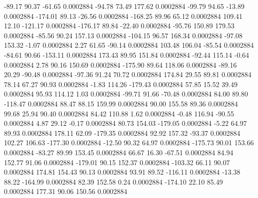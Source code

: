       -89.17       90.37      -61.65     0.0002884
      -94.78       73.49      177.62     0.0002884
      -99.79       94.65      -13.89     0.0002884
     -174.01       89.13      -26.56     0.0002884
     -168.25       89.96       65.12     0.0002884
      109.41       12.10     -121.17     0.0002884
     -176.17       89.84      -22.40     0.0002884
      -95.76      150.89      179.53     0.0002884
      -85.56       90.24      157.13     0.0002884
     -104.15       96.57      168.34     0.0002884
      -97.08      153.32       -1.07     0.0002884
        2.27       61.65      -90.14     0.0002884
      103.48      106.04      -85.54     0.0002884
      -84.61       90.66     -153.11     0.0002884
      173.43       89.95      151.84     0.0002884
      -92.44      115.14       -0.64     0.0002884
        2.78       90.16      150.69     0.0002884
     -175.90       89.64      118.06     0.0002884
      -89.16       20.29      -90.48     0.0002884
      -97.36       91.24       70.72     0.0002884
      174.84       29.55       89.81     0.0002884
       78.14       67.27       90.93     0.0002884
       -1.83      114.26     -179.43     0.0002884
       57.85       15.52       39.49     0.0002884
       95.93      114.12        1.03     0.0002884
      -99.71       91.66      -70.48     0.0002884
       84.00       89.80     -118.47     0.0002884
       88.47       88.15      159.99     0.0002884
       90.00      155.58       89.36     0.0002884
       99.68       25.94       90.40     0.0002884
       84.42      110.88        1.62     0.0002884
       -0.48      116.94      -90.55     0.0002884
        4.87       29.12       -0.17     0.0002884
       80.73      154.03     -179.05     0.0002884
       -5.22       64.97       89.93     0.0002884
      178.11       62.09     -179.35     0.0002884
       92.92      157.32      -93.37     0.0002884
      102.27      106.63     -177.30     0.0002884
      -12.50       90.32       64.97     0.0002884
     -175.73       90.01      153.66     0.0002884
      -83.27       89.99      153.45     0.0002884
       66.67       16.30      -67.51     0.0002884
       84.94      152.77       91.06     0.0002884
     -179.01       90.15      152.37     0.0002884
     -103.32       66.11       90.07     0.0002884
      174.81      154.43       90.13     0.0002884
       93.91       89.52     -116.11     0.0002884
      -13.38       88.22     -164.99     0.0002884
       82.39      152.58        0.24     0.0002884
     -174.10       22.10       85.49     0.0002884
      177.31       90.06      150.56     0.0002884
